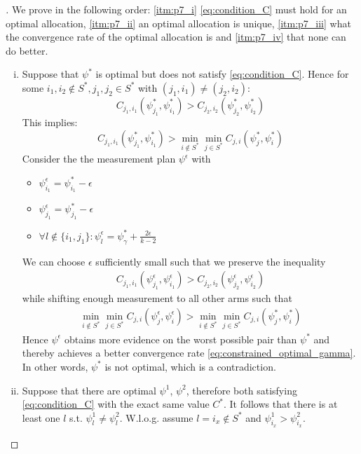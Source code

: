 \begin{proof}[]
  We prove in the following order: \eqref{itm:p7_i} \eqref{eq:condition_C} must hold for an optimal allocation, \eqref{itm:p7_ii} an optimal allocation is unique, \eqref{itm:p7_iii} what the convergence rate of the optimal allocation is and \eqref{itm:p7_iv} that none can do better.
  \begin{enumerate}[(i)]
    \item \label{itm:p7_i} Suppose that $\psi^*$ is optimal but does not satisfy \eqref{eq:condition_C}. Hence for some $i_1, i_2 \notin S^*, j_1, j_2 \in S^*$ with $(j_1, i_1) \neq (j_2, i_2)$:
    \[C_{j_1, i_1}(\psi^*_{j_1}, \psi^*_{i_1}) > C_{j_2, i_2}(\psi^*_{j_2}, \psi^*_{i_2})\]
    This implies:
    \[C_{j_1, i_1}(\psi^*_{j_1}, \psi^*_{i_1}) > \min_{i \notin S^*} \min_{j \in S^*}C_{j, i}(\psi^*_j, \psi^*_i) \]
    Consider the the measurement plan $\psi^\epsilon$ with
    \begin{itemize}
      \item $\psi^\epsilon_{i_1} = \psi^*_{i_1} - \epsilon$
      \item $\psi^\epsilon_{j_1} = \psi^*_{j_1} - \epsilon$
      \item $\forall l\notin \{i_1, j_1\}: \psi^\epsilon_l = \psi^*_\gamma + \frac{2 \epsilon}{k-2}$
    \end{itemize}
    We can choose $\epsilon$ sufficiently small such that we preserve the inequality
    \begin{align}
      C_{j_1, i_1}(\psi^\epsilon_{j_1}, \psi^\epsilon_{i_1}) > C_{j_2, i_2}(\psi^\epsilon_{j_2}, \psi^\epsilon_{i_2})
    \end{align}
    while shifting enough measurement to all other arms such that
    \begin{align}
      \min_{i \notin S^*} \min_{j \in S^*} C_{j, i}(\psi^\epsilon_{j}, \psi^\epsilon_i) > \min_{i \notin S^*} \min_{j \in S^*} C_{j, i}(\psi^*_j, \psi^*_i)
    \end{align}
    Hence $\psi^\epsilon$ obtains more evidence on the worst possible pair than $\psi^*$ and thereby achieves a better convergence rate \eqref{eq:constrained_optimal_gamma}. In other words, $\psi^*$ is not optimal, which is a contradiction.

    \item \label{itm:p7_ii} Suppose that there are optimal $\psi^1$, $\psi^2$, therefore both satisfying \eqref{eq:condition_C} with the exact same value $C^*$. It follows that there is at least one $l$ s.t. $\psi^1_{l} \neq \psi^2_{l}$. W.l.o.g. assume $l = i_x \notin S^*$ and $\psi^1_{i_x} > \psi^2_{i_x}$.


\end{enumerate}
\end{proof}
